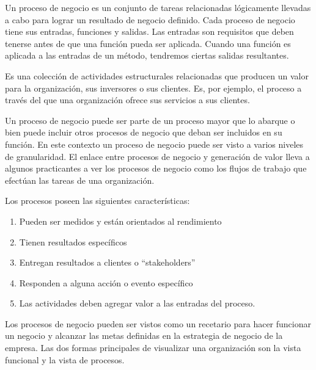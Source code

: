 \documentclass{article} %
\begin{document}
\noindent 

\noindent Un proceso de negocio es un conjunto de tareas relacionadas l\'{o}gicamente llevadas a cabo para lograr un resultado de negocio definido. Cada proceso de negocio tiene sus entradas, funciones y salidas. Las entradas son requisitos que deben tenerse antes de que una funci\'{o}n pueda ser aplicada. Cuando una funci\'{o}n es aplicada a las entradas de un m\'{e}todo, tendremos ciertas salidas resultantes.

\noindent 

\noindent Es una colecci\'{o}n de actividades estructurales relacionadas que producen un valor para la organizaci\'{o}n, sus inversores o sus clientes. Es, por ejemplo, el proceso a trav\'{e}s del que una organizaci\'{o}n ofrece sus servicios a sus clientes.

\noindent 

\noindent Un proceso de negocio puede ser parte de un proceso mayor que lo abarque o bien puede incluir otros procesos de negocio que deban ser incluidos en su funci\'{o}n. En este contexto un proceso de negocio puede ser visto a varios niveles de granularidad. El enlace entre procesos de negocio y generaci\'{o}n de valor lleva a algunos practicantes a ver los procesos de negocio como los flujos de trabajo que efect\'{u}an las tareas de una organizaci\'{o}n. 

\noindent 

\noindent Los procesos poseen las siguientes caracter\'{i}sticas:

\noindent 

\begin{enumerate}
\item  Pueden ser medidos y est\'{a}n orientados al rendimiento

\item  Tienen resultados espec\'{i}ficos

\item  Entregan resultados a clientes o ``stakeholders''

\item  Responden a alguna acci\'{o}n o evento espec\'{i}fico

\item  Las actividades deben agregar valor a las entradas del proceso.
\end{enumerate}

\noindent 

\noindent Los procesos de negocio pueden ser vistos como un recetario para hacer funcionar un negocio y alcanzar las metas definidas en la estrategia de negocio de la empresa. Las dos formas principales de visualizar una organizaci\'{o}n son la vista funcional y la vista de procesos.
\end{document}
